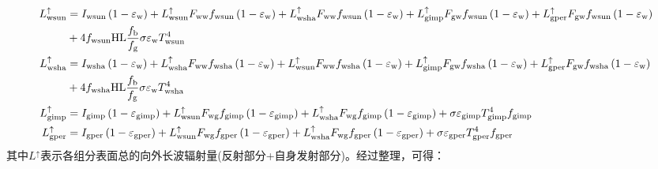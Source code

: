 \begin{landscape}
  \begin{equation}
    \begin{aligned}
      L_{\mathrm{wsun}}^{\uparrow} &=I_{\mathrm{wsun}}\left(1-\varepsilon_{\mathrm{w}}\right)+L_{\mathrm{wsun}}^{\uparrow} F_{\mathrm{ww}} f_{\mathrm{wsun}}\left(1-\varepsilon_{\mathrm{w}}\right)+L_{\mathrm{wsha}}^{\uparrow} F_{\mathrm{ww}} f_{\mathrm{wsun}}\left(1-\varepsilon_{\mathrm{w}}\right)+L_{\mathrm{gimp}}^{\uparrow} F_{\mathrm{g w}} f_{\mathrm{wsun}}\left(1-\varepsilon_{\mathrm{w}}\right) +L_{\mathrm{gper}}^{\uparrow} F_{\mathrm{g w}} f_{\mathrm{wsun}}\left(1-\varepsilon_{\mathrm{w}}\right) \\ &+4 f_{\mathrm{wsun}} {\rm HL} \frac{f_{\mathrm{b}}}{f_{\mathrm{g}}} \sigma \varepsilon_{\mathrm{w}} T_{\mathrm{wsun}}^{4}\\
      L_{\mathrm{wsha}}^{\uparrow} &=I_{\mathrm{wsha}}\left(1-\varepsilon_{\mathrm{w}}\right)+L_{\mathrm{wsha}}^{\uparrow} F_{\mathrm{ww}} f_{\mathrm{wsha}}\left(1-\varepsilon_{\mathrm{w}}\right)+L_{\mathrm{wsun}}^{\uparrow} F_{\mathrm{ww}} f_{\mathrm{wsha}}\left(1-\varepsilon_{\mathrm{w}}\right)+L_{\mathrm{gimp}}^{\uparrow} F_{\mathrm{g w}} f_{\mathrm{wsha}}\left(1-\varepsilon_{\mathrm{w}}\right)+L_{\mathrm{gper}}^{\uparrow} F_{\mathrm{g w}} f_{\mathrm{wsha}}\left(1-\varepsilon_{\mathrm{w}}\right) \\ &+4 f_{\mathrm{wsha}} {\rm HL} \frac{f_{\mathrm{b}}}{f_{\mathrm{g}}} \sigma \varepsilon_{\mathrm{w}} T_{\mathrm{wsha}}^{4}\\
      L_{\mathrm{gimp}}^{\uparrow} &=I_{\mathrm{gimp}}\left(1-\varepsilon_{\mathrm{gimp}}\right)+L_{\mathrm{wsun}}^{\uparrow} F_{\mathrm{w g}} f_{\mathrm{gimp}}\left(1-\varepsilon_{\mathrm{gimp}}\right)+L_{\mathrm{wsha}}^{\uparrow} F_{\mathrm{w g}} f_{\mathrm{gimp}}\left(1-\varepsilon_{\mathrm{gimp}}\right)+\sigma \varepsilon_{\mathrm{gimp}} T_{\mathrm{gimp}}^{4} f_{\mathrm{gimp}}\\
      L_{\mathrm{gper}}^{\uparrow} &=I_{\mathrm{gper}}\left(1-\varepsilon_{\mathrm{gper}}\right)+L_{\mathrm{wsun}}^{\uparrow} F_{\mathrm{w g}} f_{\mathrm{gper}}\left(1-\varepsilon_{\mathrm{gper}}\right)+L_{\mathrm{wsha}}^{\uparrow} F_{\mathrm{w g}} f_{\mathrm{gper}}\left(1-\varepsilon_{\mathrm{gper}}\right)+\sigma \varepsilon_{\mathrm{gper}} T_{\mathrm{gper}}^{4} f_{\mathrm{gper}}
    \end{aligned}
  \end{equation}
  其中$L^\uparrow$表示各组分表面总的向外长波辐射量(反射部分+自身发射部分)。经过整理，可得：

\end{landscape}
